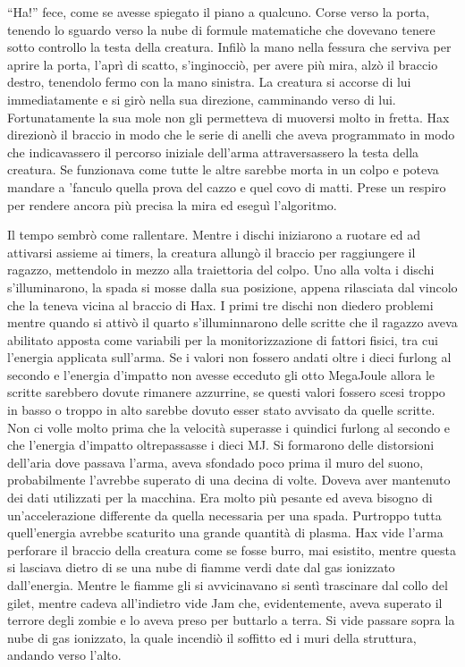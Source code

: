     ``Ha!'' fece, come se avesse spiegato il piano a qualcuno. Corse verso
    la porta, tenendo lo sguardo verso la nube di formule matematiche che
    dovevano tenere sotto controllo la testa della creatura. Infilò la mano
    nella fessura che serviva per aprire la porta, l'aprì di scatto,
    s'inginocciò, per avere più mira, alzò il braccio destro, tenendolo
    fermo con la mano sinistra. La creatura si accorse di lui
    immediatamente e si girò nella sua direzione, camminando verso di lui.
    Fortunatamente la sua mole non gli permetteva di muoversi molto in
    fretta. Hax direzionò il braccio in modo che le serie di anelli che
    aveva programmato in modo che indicavassero il percorso iniziale
    dell'arma attraversassero la testa della creatura. Se funzionava come
    tutte le altre sarebbe morta in un colpo e poteva mandare a 'fanculo
    quella prova del cazzo e quel covo di matti. Prese un respiro per
    rendere ancora più precisa la mira ed eseguì l'algoritmo.

    Il tempo sembrò come rallentare. Mentre i dischi iniziarono a ruotare
    ed ad attivarsi assieme ai timers, la creatura allungò il braccio per
    raggiungere il ragazzo, mettendolo in mezzo alla traiettoria del colpo.
    Uno alla volta i dischi s'illuminarono, la spada si mosse dalla sua
    posizione, appena rilasciata dal vincolo che la teneva vicina al
    braccio di Hax. I primi tre dischi non diedero problemi mentre quando
    si attivò il quarto s'illuminnarono delle scritte che il ragazzo aveva
    abilitato apposta come variabili per la monitorizzazione di fattori
    fisici, tra cui l'energia applicata sull'arma. Se i valori non fossero
    andati oltre i dieci furlong al secondo e l'energia d'impatto non
    avesse ecceduto gli otto MegaJoule allora le scritte sarebbero dovute
    rimanere azzurrine, se questi valori fossero scesi troppo in basso o
    troppo in alto sarebbe dovuto esser stato avvisato da quelle scritte.
    Non ci volle molto prima che la velocità superasse i quindici furlong
    al secondo e che l'energia d'impatto oltrepassasse i dieci MJ. Si
    formarono delle distorsioni dell'aria dove passava l'arma, aveva
    sfondado poco prima il muro del suono, probabilmente l'avrebbe superato
    di una decina di volte. Doveva
    aver mantenuto dei dati utilizzati per la macchina. Era molto più
    pesante ed aveva bisogno di un'accelerazione differente da quella
    necessaria per una spada. Purtroppo tutta quell'energia avrebbe
    scaturito una grande quantità di plasma. Hax vide l'arma perforare il
    braccio della creatura come se fosse burro, mai esistito, mentre questa
    si lasciava dietro di se una nube di fiamme verdi date dal gas
    ionizzato dall'energia. Mentre le fiamme gli si avvicinavano si sentì
    trascinare dal collo del gilet, mentre cadeva all'indietro vide Jam
    che, evidentemente, aveva superato il terrore degli zombie e lo aveva
    preso per buttarlo a terra. Si vide passare sopra la nube di gas
    ionizzato, la quale incendiò il soffitto ed i muri della struttura,
    andando verso l'alto.
    
